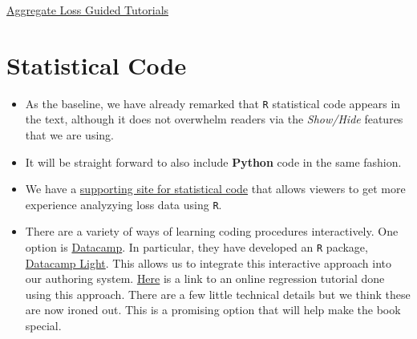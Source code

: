 \documentclass[
]{book}
\begin{document}
\href{https://www.ssc.wisc.edu/~jfrees/loss-data-analytics/aggregate-loss-guided-tutorials/}{Aggregate Loss Guided Tutorials}

\hypertarget{S:StatisticalCode}{%
\chapter{Statistical Code}\label{S:StatisticalCode}}

\begin{itemize}
\item
  As the baseline, we have already remarked that \texttt{R} statistical code appears in the text, although it does not overwhelm readers via the \emph{Show/Hide} features that we are using.
\item
  It will be straight forward to also include \textbf{Python} code in the same fashion.
\item
  We have a \href{https://ewfrees.github.io/LDARcode/index.html}{supporting site for statistical code} that allows viewers to get more experience analyzying loss data using \texttt{R}.
\item
  There are a variety of ways of learning coding procedures interactively. One option is \href{https://www.datacamp.com}{Datacamp}. In particular, they have developed an \texttt{R} package, \href{https://support.datacamp.com/hc/en-us/articles/360007749853-What-is-DataCamp-Light-}{Datacamp Light}. This allows us to integrate this interactive approach into our authoring system. \href{https://ewfreesres.github.io/RegressModel/index.html}{Here} is a link to an online regression tutorial done using this approach. There are a few little technical details but we think these are now ironed out. This is a promising option that will help make the book special.
\end{itemize}
\end{document}
